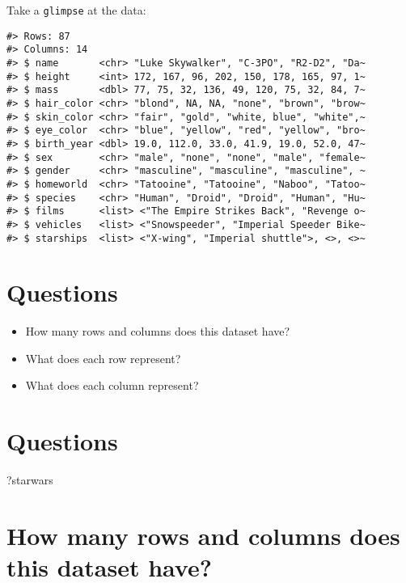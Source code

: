 \documentclass[
]{book}
\newenvironment{Shaded}{\begin{snugshade}}{\end{snugshade}}
\newcommand{\NormalTok}[1]{#1}
\providecommand{\tightlist}{%
  \setlength{\itemsep}{0pt}\setlength{\parskip}{0pt}}
\theoremstyle{definition}
\theoremstyle{definition}
\theoremstyle{definition}
\theoremstyle{definition}
\theoremstyle{remark}
\begin{document}
Take a \texttt{glimpse} at the data:

\begin{verbatim}
#> Rows: 87
#> Columns: 14
#> $ name       <chr> "Luke Skywalker", "C-3PO", "R2-D2", "Da~
#> $ height     <int> 172, 167, 96, 202, 150, 178, 165, 97, 1~
#> $ mass       <dbl> 77, 75, 32, 136, 49, 120, 75, 32, 84, 7~
#> $ hair_color <chr> "blond", NA, NA, "none", "brown", "brow~
#> $ skin_color <chr> "fair", "gold", "white, blue", "white",~
#> $ eye_color  <chr> "blue", "yellow", "red", "yellow", "bro~
#> $ birth_year <dbl> 19.0, 112.0, 33.0, 41.9, 19.0, 52.0, 47~
#> $ sex        <chr> "male", "none", "none", "male", "female~
#> $ gender     <chr> "masculine", "masculine", "masculine", ~
#> $ homeworld  <chr> "Tatooine", "Tatooine", "Naboo", "Tatoo~
#> $ species    <chr> "Human", "Droid", "Droid", "Human", "Hu~
#> $ films      <list> <"The Empire Strikes Back", "Revenge o~
#> $ vehicles   <list> <"Snowspeeder", "Imperial Speeder Bike~
#> $ starships  <list> <"X-wing", "Imperial shuttle">, <>, <>~
\end{verbatim}

\hypertarget{questions-3}{%
\section{Questions}\label{questions-3}}

\begin{itemize}
\tightlist
\item
  How many rows and columns does this dataset have?
\item
  What does each row represent?
\item
  What does each column represent?
\end{itemize}

\hypertarget{questions-4}{%
\section{Questions}\label{questions-4}}

\begin{Shaded}
\begin{Highlighting}[]
\NormalTok{?starwars}
\end{Highlighting}
\end{Shaded}

\hypertarget{how-many-rows-and-columns-does-this-dataset-have-1}{%
\section{How many rows and columns does this dataset have?}\label{how-many-rows-and-columns-does-this-dataset-have-1}}
\end{document}
